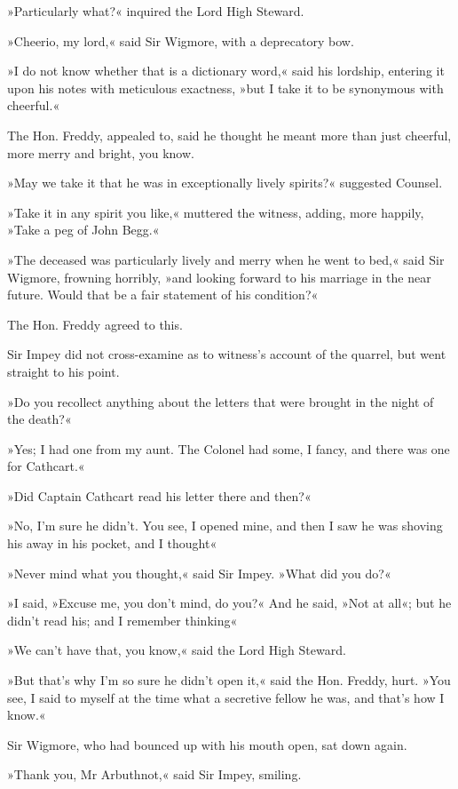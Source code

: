 »Particularly what?« inquired the Lord High Steward.

»Cheerio, my lord,« said Sir Wigmore, with a deprecatory bow.

»I do not know whether that is a dictionary word,« said his lordship, entering it upon his notes with meticulous exactness, »but I take it to be synonymous with cheerful.«

The Hon. Freddy, appealed to, said he thought he meant more than just cheerful, more merry and bright, you know.

»May we take it that he was in exceptionally lively spirits?« suggested Counsel.

»Take it in any spirit you like,« muttered the witness, adding, more happily, »Take a peg of John Begg.«

»The deceased was particularly lively and merry when he went to bed,« said Sir Wigmore, frowning horribly, »and looking forward to his marriage in the near future. Would that be a fair statement of his condition?«

The Hon. Freddy agreed to this.

Sir Impey did not cross-examine as to witness's account of the quarrel, but went straight to his point.

»Do you recollect anything about the letters that were brought in the night of the death?«

»Yes; I had one from my aunt. The Colonel had some, I fancy, and there was one for Cathcart.«

»Did Captain Cathcart read his letter there and then?«

»No, I'm sure he didn't. You see, I opened mine, and then I saw he was shoving his away in his pocket, and I thought\longdash«

»Never mind what you thought,« said Sir Impey. »What did you do?«

»I said, »Excuse me, you don't mind, do you?« And he said, »Not at all«; but he didn't read his; and I remember thinking\longdash«

»We can't have that, you know,« said the Lord High Steward.

»But that's why I'm so sure he didn't open it,« said the Hon. Freddy, hurt. »You see, I said to myself at the time what a secretive fellow he was, and that's how I know.«

Sir Wigmore, who had bounced up with his mouth open, sat down again.

»Thank you, Mr Arbuthnot,« said Sir Impey, smiling.

